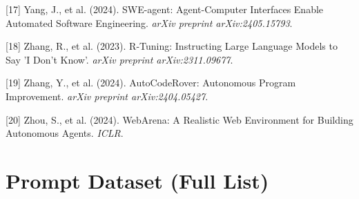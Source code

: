 \documentclass{article}
\begin{document}
[17] Yang, J., et al. (2024). SWE-agent: Agent-Computer Interfaces Enable Automated Software Engineering. \textit{arXiv preprint arXiv:2405.15793}.

[18] Zhang, R., et al. (2023). R-Tuning: Instructing Large Language Models to Say 'I Don't Know'. \textit{arXiv preprint arXiv:2311.09677}.

[19] Zhang, Y., et al. (2024). AutoCodeRover: Autonomous Program Improvement. \textit{arXiv preprint arXiv:2404.05427}.

[20] Zhou, S., et al. (2024). WebArena: A Realistic Web Environment for Building Autonomous Agents. \textit{ICLR}.


\appendix

\section{Prompt Dataset (Full List)}
\label{sec:prompt-dataset}
\end{document}
